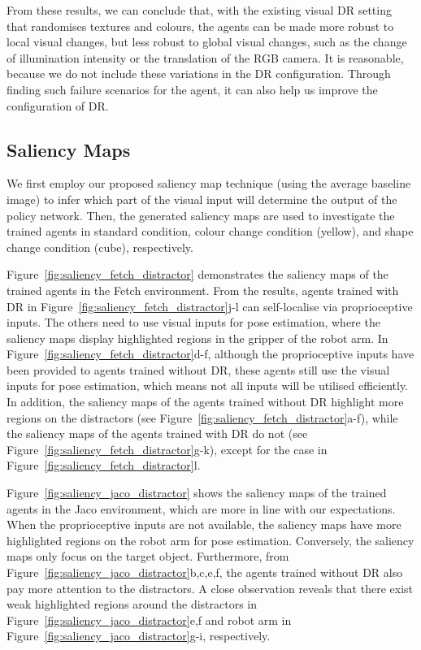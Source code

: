 From these results, we can conclude that, with the existing visual DR setting that randomises textures and colours, the agents can be made more robust to local visual changes, but less robust to global visual changes, such as the change of illumination intensity or the translation of the RGB camera. It is reasonable, because we do not include these variations in the DR configuration. Through finding such failure scenarios for the agent, it can also help us improve the configuration of DR.

\subsection{Saliency Maps}
We first employ our proposed saliency map technique (using the average baseline image) to infer which part of the visual input will determine the output of the policy network. Then, the generated saliency maps are used to investigate the trained agents in standard condition, colour change condition (yellow), and shape change condition (cube), respectively. 

Figure~\ref{fig:saliency_fetch_distractor} demonstrates the saliency maps of the trained agents in the Fetch environment. From the results, agents trained with DR in Figure~\ref{fig:saliency_fetch_distractor}j-l can self-localise via proprioceptive inputs. The others need to use visual inputs for pose estimation, where the saliency maps display highlighted regions in the gripper of the robot arm. In Figure~\ref{fig:saliency_fetch_distractor}d-f, although the proprioceptive inputs have been provided to agents trained without DR, these agents still use the visual inputs for pose estimation, which means not all inputs will be utilised efficiently. In addition, the saliency maps of the agents trained without DR highlight more regions on the distractors (see Figure~\ref{fig:saliency_fetch_distractor}a-f), while the saliency maps of the agents trained with DR do not (see Figure~\ref{fig:saliency_fetch_distractor}g-k), except for the case in Figure~\ref{fig:saliency_fetch_distractor}l. 

Figure~\ref{fig:saliency_jaco_distractor} shows the saliency maps of the trained agents in the Jaco environment, which are more in line with our expectations. When the proprioceptive inputs are not available, the saliency maps have more highlighted regions on the robot arm for pose estimation. Conversely, the saliency maps only focus on the target object. Furthermore, from Figure~\ref{fig:saliency_jaco_distractor}b,c,e,f, the agents trained without DR also pay more attention to the distractors. A close observation reveals that there exist weak highlighted regions around the distractors in Figure~\ref{fig:saliency_jaco_distractor}e,f and robot arm in Figure~\ref{fig:saliency_jaco_distractor}g-i, respectively.

